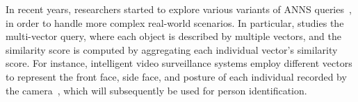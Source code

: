 In recent years, researchers {%
started to explore various} variants of ANNS queries~\cite{pan2024vector}, in order to handle more complex real-world scenarios. 
{%
In particular, \cite{milvus2021} studies the multi-vector query, where each object is described by multiple vectors, and the similarity score is computed by aggregating %
each individual vector's similarity score.%
} %
{For instance, intelligent video surveillance systems employ different vectors to represent the front face, side face, and posture of each individual recorded by the camera~\cite{baltruvsaitis2018multimodal}, which will subsequently be used for person identification.}



